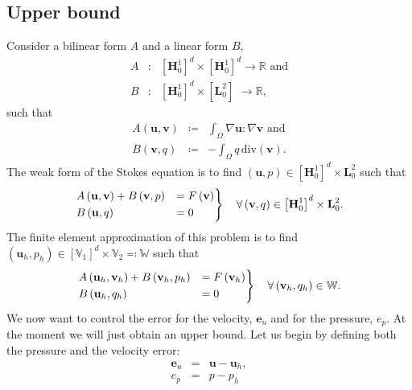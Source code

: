 \documentclass[12pt,a4paper]{article}
\theoremstyle{definition}
\begin{document}
\subsection{Upper bound}
Consider a bilinear form $A$ and a linear form $B$,
\begin{eqnarray}
	A&:&\left[\textbf{H}^1_0\right]^d\times\left[\textbf{H}^1_0\right]^d \rightarrow\mathbb{R}\text{ and}\\
B&:&\left[\textbf{H}^1_0\right]^d\times \left[\textbf{L}^2_0\right]\,\,\rightarrow\mathbb{R},
\end{eqnarray}
such that
\begin{eqnarray}
	A\left(\textbf{u},\textbf{v}\right)&\coloneqq& \int_{\Omega}\nabla\textbf{u}:\nabla \textbf{v}\text{ and}\\
	B\left(\textbf{v},q\right)&\coloneqq&-\int_{\Omega}q\,\text{div}\left(\textbf{v}\right).
\end{eqnarray}
The weak form of the Stokes equation is to find $\left(\textbf{u},p\right)\in \left[\textbf{H}^1_0\right]^d  \times \textbf{L}^2_0$ such that
\begin{equation}\label{weak_stokes}
\begin{rcases}
A\left(\textbf{u},\textbf{v}\right)+B\left(\textbf{v},p\right)&=F\left(\textbf{v}\right)\\
B\left(\textbf{u},q\right)&=0
\end{rcases}
\quad\forall \left(\textbf{v},q\right)\in \left[\textbf{H}^1_0\right]^d  \times \textbf{L}^2_0.
\end{equation}
The finite element approximation of this problem is to find $\left(\textbf{u}_h,p_h\right)\in \left[\mathbb{V}_1\right]^d  \times \mathbb{V}_2\eqqcolon\mathbb{W}$ such that
\begin{equation}\label{weak_stokes_approx}
\begin{rcases}
A\left(\textbf{u}_h,\textbf{v}_h\right)+B\left(\textbf{v}_h,p_h\right)&=F\left(\textbf{v}_h\right)\\
B\left(\textbf{u}_h,q_h\right)&=0
\end{rcases}
\quad\forall \left(\textbf{v}_h,q_h\right)\in \mathbb{W}.
\end{equation}
We now want to control the error for the velocity, $\textbf{e}_u$ and for the pressure, $e_p$.   At the moment we will just obtain an upper bound.  Let us begin by defining both the pressure and the velocity error:
\begin{eqnarray}\label{error_velocity}
\textbf{e}_u&=&\textbf{u}-\textbf{u}_h,\\\label{error_pressure}
e_p &=& p-p_h
\end{eqnarray}
\end{document}
